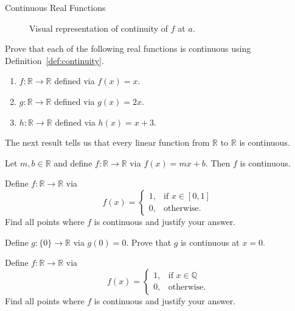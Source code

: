 \begin{section}{Continuous Real Functions}
\begin{figure}[h!]
\caption{Visual representation of continuity of $f$ at $a$.}\label{fig:continuity}
\end{figure}

\begin{problem}
Prove that each of the following real functions is continuous using Definition~\ref{def:continuity}.
\begin{enumerate}[label=\textrm{(\alph*)}]
\item $f:\mathbb{R}\to \mathbb{R}$ defined via $f(x)=x$.
\item $g:\mathbb{R}\to \mathbb{R}$ defined via $g(x)=2x$.
\item $h:\mathbb{R}\to \mathbb{R}$ defined via $h(x)=x+3$.
\end{enumerate}
\end{problem}

The next result tells us that every linear function from $\mathbb{R}$ to $\mathbb{R}$ is continuous.

\begin{theorem}
Let $m,b\in\mathbb{R}$ and define $f:\mathbb{R}\to\mathbb{R}$ via $f(x)=mx+b$. Then $f$ is continuous.
\end{theorem}

\begin{problem}
Define $f:\mathbb{R}\to\mathbb{R}$ via 
\[
f(x)=\begin{cases}
1, & \text{if }x\in[0,1]\\
0, & \text{otherwise}.
\end{cases}
\]
Find all points where $f$ is continuous and justify your answer.
\end{problem}

\begin{problem}
Define $g:\{0\}\to \mathbb{R}$ via $g(0)=0$.  Prove that $g$ is continuous at $x=0$.
\end{problem}

\begin{problem}
Define $f:\mathbb{R}\to\mathbb{R}$ via 
\[
f(x)=\begin{cases}
1, & \text{if }x\in \mathbb{Q}\\
0, & \text{otherwise}.
\end{cases}
\]
Find all points where $f$ is continuous and justify your answer.
\end{problem}


\end{section}
